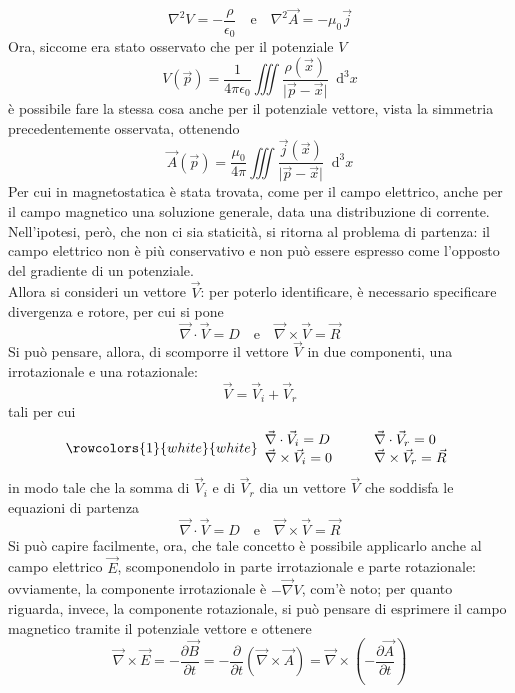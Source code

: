 \documentclass[a4paper]{extarticle}
\newcommand\dif{\mathop{}\!\mathrm{d}}
\begin{document}
\[\nabla^2 V = - \frac{\rho}{\epsilon_0} \hspace{1em} \text{e} \hspace{1em} \nabla^2 \vec A = - \mu_0 \vec j\]
Ora, siccome era stato osservato che per il potenziale $V$
\[V(\vec p) = \dfrac{1}{4 \pi \epsilon_0} \iiint \dfrac{\rho(\vec x)}{\vert \vec p - \vec x \vert} \dif^3 x\]
è possibile fare la stessa cosa anche per il potenziale vettore, vista la simmetria precedentemente osservata, ottenendo
\[\vec A(\vec p) = \dfrac{\mu_0}{4 \pi} \iiint \dfrac{\vec j(\vec x)}{\vert \vec p - \vec x \vert} \dif^3 x\]
Per cui in magnetostatica è stata trovata, come per il campo elettrico, anche per il campo magnetico una soluzione generale, data una distribuzione di corrente.\\
Nell'ipotesi, però, che non ci sia staticità, si ritorna al problema di partenza: il campo elettrico non è più conservativo e non può essere espresso come l'opposto del gradiente di un potenziale.\\
Allora si consideri un vettore $\vec V$: per poterlo identificare, è necessario specificare divergenza e rotore, per cui si pone
\[\vec \nabla \cdot \vec V = D \hspace{1em} \text{e} \hspace{1em} \vec \nabla \times \vec V = \vec R\]
Si può pensare, allora, di scomporre il vettore $\vec V$ in due componenti, una irrotazionale e una rotazionale:
\[\vec V = \vec V_i + \vec V_r\]
tali per cui
\[
    \rowcolors{1}{white}{white}
    \begin{array}{llll}
      \vec \nabla \cdot \vec V_i = D & & & \vec \nabla \cdot \vec V_r = 0\\
      \vec \nabla \times \vec V_i = 0 & & & \vec \nabla \times \vec V_r =\vec R\\
    \end{array}
\]
in modo tale che la somma di $\vec V_i$ e di $\vec V_r$ dia un vettore $\vec V$ che soddisfa le equazioni di partenza
\[\vec \nabla \cdot \vec V = D \hspace{1em} \text{e} \hspace{1em} \vec \nabla \times \vec V = \vec R\]
Si può capire facilmente, ora, che tale concetto è possibile applicarlo anche al campo elettrico $\vec E$, scomponendolo in parte irrotazionale e parte rotazionale: ovviamente, la componente irrotazionale è $- \vec \nabla V$, com'è noto; per quanto riguarda, invece, la componente rotazionale, si può pensare di esprimere il campo magnetico tramite il potenziale vettore e ottenere
\[\vec \nabla \times \vec E = - \frac{\partial \vec B}{\partial t} = - \frac{\partial}{\partial t} \left(\vec \nabla \times \vec A\right) = \vec \nabla \times \left(-\frac{\partial \vec A}{\partial t}\right)\]
\end{document}
